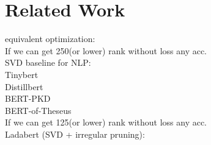 \section{Related Work}
equivalent optimization: \cite{chen2018groupreduce}\\

If we can get 250(or lower) rank without loss any acc.\\
SVD baseline for NLP:\cite{noach2020compressing}\\
Tinybert\\
Distillbert\\
BERT-PKD\\
BERT-of-Theseus \cite{xu-etal-2020-bert}\\


If we can get 125(or lower) rank without loss any acc.\\
Ladabert (SVD + irregular pruning): \cite{mao2020ladabert}